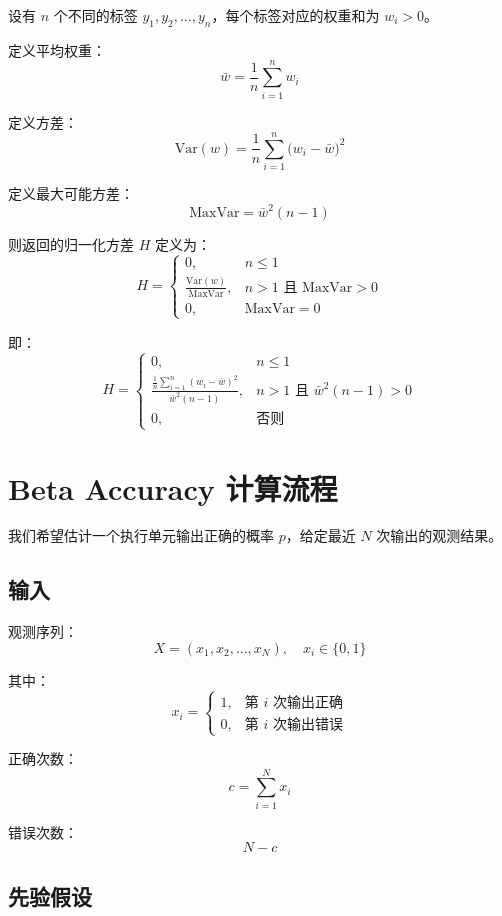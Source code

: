 \documentclass{article}
\begin{document}
设有 $n$ 个不同的标签 $y_1, y_2, \dots, y_n$，每个标签对应的权重和为 $w_i > 0$。

定义平均权重：
\[
\bar{w} = \frac{1}{n} \sum_{i=1}^{n} w_i
\]

定义方差：
\[
\mathrm{Var}(w) =
\frac{1}{n} \sum_{i=1}^{n} \bigl(w_i - \bar{w}\bigr)^2
\]

定义最大可能方差：
\[
\mathrm{MaxVar} =
\bar{w}^2 (n-1)
\]

则返回的归一化方差 $H$ 定义为：
\[
H =
\begin{cases}
0, & n \leq 1 \\[10pt]
\displaystyle
\frac{\mathrm{Var}(w)}{\mathrm{MaxVar}}, & n > 1 \text{ 且 } \mathrm{MaxVar} > 0 \\[10pt]
0, & \mathrm{MaxVar} = 0
\end{cases}
\]

即：
\[
H =
\begin{cases}
0, & n \leq 1 \\[10pt]
\displaystyle
\frac{
\frac{1}{n} \sum_{i=1}^{n} (w_i - \bar{w})^2
}{
\bar{w}^2 (n-1)
}, & n > 1 \text{ 且 } \bar{w}^2 (n-1) > 0 \\[10pt]
0, & \text{否则}
\end{cases}
\]

\section*{Beta Accuracy 计算流程}

我们希望估计一个执行单元输出正确的概率 \( p \)，给定最近 \( N \) 次输出的观测结果。

\subsection*{输入}

观测序列：
\[
X = (x_1, x_2, \dots, x_N), \quad x_i \in \{0,1\}
\]

其中：
\[
x_i =
\begin{cases} 
1, & \text{第 \(i\) 次输出正确} \\[6pt]
0, & \text{第 \(i\) 次输出错误}
\end{cases}
\]

正确次数：
\[
c = \sum_{i=1}^{N} x_i
\]

错误次数：
\[
N-c
\]

\subsection*{先验假设}
\end{document}
